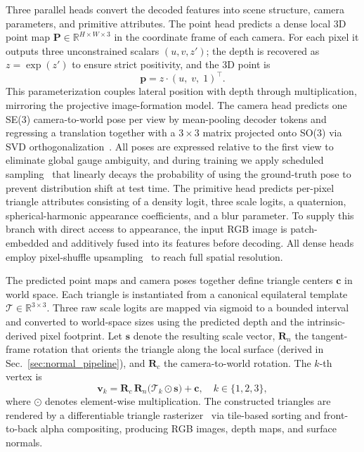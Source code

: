 Three parallel heads convert the decoded features into scene structure, camera parameters, and primitive attributes. The point head predicts a dense local 3D point map $\mathbf{P}\!\in\!\mathbb{R}^{H\times W\times 3}$ in the coordinate frame of each camera. For each pixel it outputs three unconstrained scalars $(u, v, z')$; the depth is recovered as $z = \exp(z')$ to ensure strict positivity, and the 3D point is
\begin{equation}
    \mathbf{p} = z \cdot (u,\; v,\; 1)^\top.
    \label{eq:point}
\end{equation}
This parameterization couples lateral position with depth through multiplication, mirroring the projective image-formation model. The camera head predicts one SE(3) camera-to-world pose per view by mean-pooling decoder tokens and regressing a translation together with a $3\!\times\!3$ matrix projected onto SO(3) via SVD orthogonalization~\citep{levinson2020analysis}. All poses are expressed relative to the first view to eliminate global gauge ambiguity, and during training we apply scheduled sampling~\citep{bengio2015scheduled} that linearly decays the probability of using the ground-truth pose to prevent distribution shift at test time. The primitive head predicts per-pixel triangle attributes consisting of a density logit, three scale logits, a quaternion, spherical-harmonic appearance coefficients, and a blur parameter. To supply this branch with direct access to appearance, the input RGB image is patch-embedded and additively fused into its features before decoding. All dense heads employ pixel-shuffle upsampling~\citep{shi2016real} to reach full spatial resolution.

The predicted point maps and camera poses together define triangle centers $\mathbf{c}$ in world space. Each triangle is instantiated from a canonical equilateral template $\mathcal{T}\!\in\!\mathbb{R}^{3\times 3}$. Three raw scale logits are mapped via sigmoid to a bounded interval and converted to world-space sizes using the predicted depth and the intrinsic-derived pixel footprint. Let $\mathbf{s}$ denote the resulting scale vector, $\mathbf{R}_n$ the tangent-frame rotation that orients the triangle along the local surface (derived in Sec.~\ref{sec:normal_pipeline}), and $\mathbf{R}_c$ the camera-to-world rotation. The $k$-th vertex is
\begin{equation}
    \mathbf{v}_k = \mathbf{R}_c \, \mathbf{R}_n \bigl(\mathcal{T}_k \odot \mathbf{s}\bigr) + \mathbf{c}, \quad k \in \{1, 2, 3\},
    \label{eq:vertex}
\end{equation}
where $\odot$ denotes element-wise multiplication. The constructed triangles are rendered by a differentiable triangle rasterizer~\citep{Held2025Triangle} via tile-based sorting and front-to-back alpha compositing, producing RGB images, depth maps, and surface normals.

